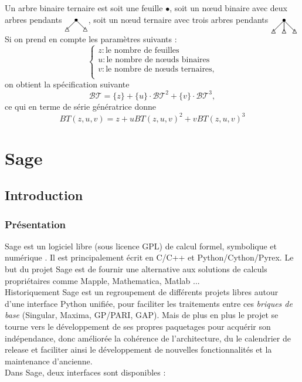 \documentclass[12pt]{article}
\begin{document}
Un arbre binaire ternaire est soit une feuille $\bullet$, 
soit un nœud binaire avec deux arbres pendants $\xymatrix@R=5pt @C=5pt{& *={\bullet} \ar@{-}[dl]\ar@{-}[dr]& \\ *={\triangle}&&*={\triangle} } $,
soit un nœud ternaire avec trois arbres pendants $\xymatrix@R=10pt @C=10pt{& *={\bullet} \ar@{-}[dl]\ar@{-}[dr]\ar@{-}[d]& \\ *={\triangle}&*={\triangle}&*={\triangle} } $
Si on prend en compte les paramètres suivants :
$$\left\{
\begin{array}{l}
  z : \text{le nombre de feuilles}\\
  u : \text{le nombre de nœuds binaires}\\
  v : \text{le nombre de nœuds ternaires,}\\
\end{array}
$$
on obtient la spécification suivante
$$\mathcal{BT} = \{z\} + \{u\}\cdot\mathcal{BT}^2 + \{v\}\cdot\mathcal{BT}^3, $$
ce qui en terme de série génératrice donne 
$$BT(z,u,v) = z+uBT(z,u,v)^2+vBT(z,u,v)^3$$

\section{Sage}

\subsection{Introduction}

\subsubsection{Présentation}
Sage est un logiciel libre (sous licence GPL) de calcul formel, symbolique et
numérique \cite{sage}. Il est principalement écrit en C/C++ et Python/Cython/Pyrex. Le but
du projet Sage est de fournir une alternative aux solutions de calculs
propriétaires comme Mapple, Mathematica, Matlab ... \\
Historiquement Sage est un regroupement de différents projets libres autour
d'une interface Python unifiée, pour faciliter les traitements entre ces
\emph{briques de base} (Singular, Maxima, GP/PARI, GAP). Mais de plus en plus
le projet se tourne vers le développement de ses propres paquetages pour
acquérir son indépendance, donc améliorée la cohérence de l'architecture, 
du le calendrier de release et faciliter ainsi le développement de nouvelles
fonctionnalités et la maintenance d'ancienne.\\
Dans Sage, deux interfaces sont disponibles :
\end{document}
